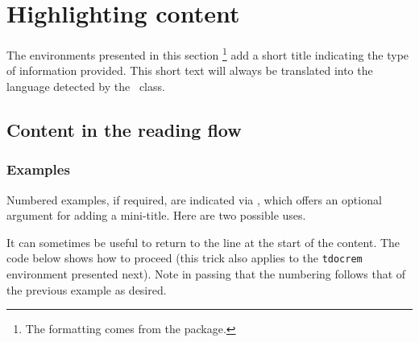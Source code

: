 
\section{Highlighting content}

\begin{tdocnote}
    The environments presented in this section
    \footnote{
        The formatting comes from the  package.
    }
    add a short title indicating the type of information provided.
    This short text will always be translated into the language detected by the \thisproj\ class.
\end{tdocnote}


\subsection{Content in the reading flow}








\subsubsection{Examples}

Numbered examples, if required, are indicated via , which offers an optional argument for adding a mini-title.
Here are two possible uses.






\begin{tdoctip}
    It can sometimes be useful to return to the line at the start of the content. The code below shows how to proceed (this trick also applies to the \verb#tdocrem# environment presented next). Note in passing that the numbering follows that of the previous example as desired.
\end{tdoctip}

